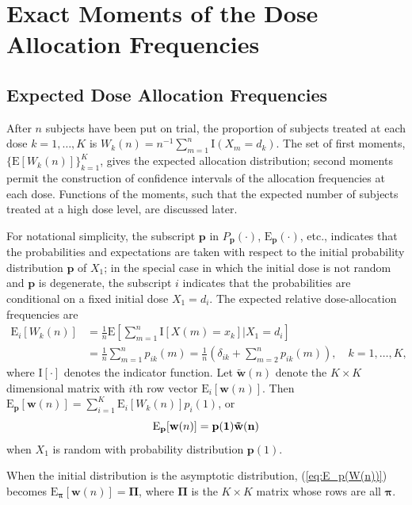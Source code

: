 \section{Exact Moments of the Dose Allocation Frequencies}

\subsection{Expected Dose Allocation Frequencies}\label{sec:trialfrequencies}
After $n$ subjects have been put on trial, the proportion of subjects treated at each dose $k=1,\ldots,K$ is $W_k(n)=n^{-1}\sum_{m=1}^n\textrm{I}(X_m=d_k)$.
%
The set of first moments, $\{\mathrm{E}[W_k(n)]\}_{k=1}^K$, gives the expected allocation distribution; second moments permit the construction of confidence intervals of the allocation frequencies at each dose.  Functions of the moments, such that the expected number of subjects treated at a high dose level, are discussed later.

For notational simplicity, the subscript $\mathbf{p}$ in $P_{\mathbf{p}}(\cdot)$,
$\mathrm{E}_{\mathbf{p}}(\cdot)$, etc., indicates that the probabilities and
expectations are taken with respect to the initial probability distribution $\mathbf{p}$ of
$X_1$; in the special case in which the initial dose is not
random and $\mathbf{p}$ is degenerate, the subscript $i$ indicates
that the probabilities are conditional on a fixed initial dose
$X_1=d_i$.  The expected relative dose-allocation frequencies are
\begin{align}\label{eq:E_i(W_k(n))}
\mathrm{E}_i\left[W_k(n)\right]
&=\frac{1}{n}\mathrm{E}\left[\sum_{m=1}^n\textrm{I}[X(m)=x_k]|X_1=d_i\right]\nonumber \\
&=\frac{1}{n}\sum_{m=1}^np_{ik}(m)=\frac{1}{n}\left(\delta_{ik}+
\sum_{m=2}^np_{ik}(m)\right),\quad k=1,\ldots, K,
\end{align}
where $\textrm{I}[\cdot]$ denotes the indicator function. Let $\tilde{\mathbf{w}}(n)$ denote the $K\times K$ dimensional matrix
with $i$th row vector $\mathrm{E}_i[\mathbf{w}(n)]$.  Then
$\mathrm{E}_{\mathbf{p}}[\mathbf{w}(n)]
=\sum_{i=1}^K\mathrm{E}_i[W_k(n)]p_i(1)$, or
%
\begin{equation}\label{eq:E_p(W(n))}
\mathrm{E}_{\mathbf{p}}[\mathbf{w}(n)]
=\bf{p}(1)\tilde{\mathbf{w}}(n)
\end{equation}
when $X_1$ is random with probability distribution $\mathbf{p}(1)$.

When the initial distribution is the asymptotic distribution,
(\ref{eq:E_p(W(n))}) becomes $\mathrm{E}_{\boldsymbol{\pi}}[\mathbf{w}(n)]=\boldsymbol{\Pi}$, where
$\mathbf{\Pi}$ is the $K\times K$ matrix whose rows are all $\boldsymbol{\pi}$.

